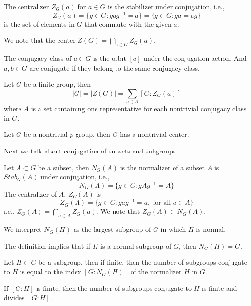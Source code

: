 \documentclass[openany]{book}
\begin{document}
\begin{defn}[centralizer]
    The centralizer $Z_G(a)$ for $a\in G$ is the stabilizer under conjugation, i.e., 
    \begin{equation*}
        Z_G(a)=\{g\in G: gag^{-1}=a\}=\{g\in G: ga=ag\}
    \end{equation*}
    is the set of elements in $G$ that commute with the given $a$.

    We note that the center $Z(G)=\bigcap_{a\in G}Z_G(a)$.
\end{defn}
\begin{defn}
    The conjugacy class of $a\in G$ is the orbit $[a]$ under the conjugation action. And $a,b\in G$ are conjugate if they belong to the same conjugacy class.
\end{defn}
\begin{prop}
    Let $G$ be a finite group, then 
    \begin{equation*}
        |G|=|Z(G)|=\sum_{a\in A}[G:Z_G(a)]
    \end{equation*}
    where $A$ is a set containing one representative for each nontrivial conjugacy class in $G$.
\end{prop}
\begin{cor}
    Let $G$ be a nontrivial $p$ group, then $G$ has a nontrivial center.
\end{cor}
Next we talk about conjugation of subsets and subgroups.
\begin{defn}
    Let $A\subset G$ be a subset, then $N_G(A)$ is the normalizer of a subset $A$ is $Stab_G(A)$ under conjugation, i.e., 
    \begin{equation*}
        N_G(A)=\{g\in G: gAg^{-1}=A\}
    \end{equation*}
    The centralizer of $A$, $Z_G(A)$ is 
    \begin{equation*}
        Z_G(A)=\{g\in G: gag^{-1}=a, \text{ for all } a\in A\}
    \end{equation*}
    i.e., $Z_G(A)=\bigcap_{a\in A}Z_G(a)$. We note that $Z_G(A)\subset N_G(A)$.

    We interpret $N_G(H)$ as the largest subgroup of $G$ in which $H$ is normal.
\end{defn}
The definition implies that if $H$ is a normal subgroup of $G$, then $N_G(H)=G$.

\begin{lem}
    Let $H\subset G$ be a subgroup, then if finite, then the number of subgroups conjugate to $H$ is equal to the index $[G:N_G(H)]$ of the normalizer $H$ in $G$.
\end{lem}
\begin{prop}
    If $[G:H]$ is finite, then the number of subgroups conjugate to $H$ is finite and divides $[G:H]$.
\end{prop}
\end{document}
